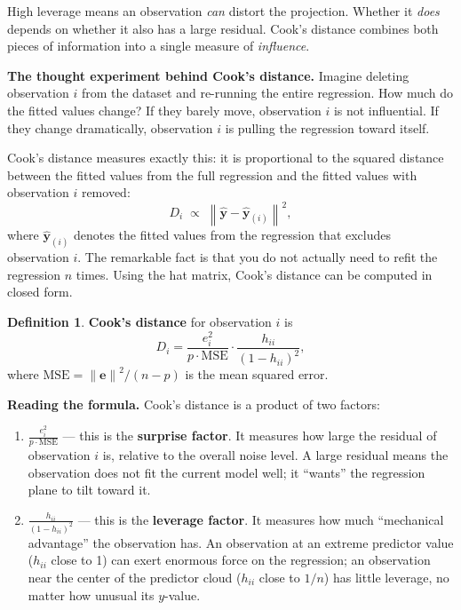 \documentclass[11pt,a4paper]{article}
\theoremstyle{plain}
\theoremstyle{definition}
\newtheorem{definition}[theorem]{Definition}
\newcommand{\yhat}{\hat{\bm{y}}}
\newcommand{\be}{\bm{e}}
\newcommand{\norm}[1]{\left\lVert #1 \right\rVert}
\begin{document}
High leverage means an observation \emph{can} distort the projection.
Whether it \emph{does} depends on whether it also has a large residual.
Cook's distance combines both pieces of information into a single measure of \emph{influence}.

\medskip
\noindent\textbf{The thought experiment behind Cook's distance.}
Imagine deleting observation $i$ from the dataset and re-running the entire regression.
How much do the fitted values change?
If they barely move, observation $i$ is not influential.
If they change dramatically, observation $i$ is pulling the regression toward itself.

Cook's distance measures exactly this: it is proportional to the squared distance between the fitted values from the full regression and the fitted values with observation $i$ removed:
\[
  D_i \;\propto\; \norm{\yhat - \yhat_{(i)}}^2,
\]
where $\yhat_{(i)}$ denotes the fitted values from the regression that excludes observation $i$.
The remarkable fact is that you do not actually need to refit the regression $n$ times.
Using the hat matrix, Cook's distance can be computed in closed form.

\begin{definition}
\textbf{Cook's distance} for observation $i$ is
\[
  D_i = \frac{e_i^2}{p\cdot\text{MSE}}
        \cdot \frac{h_{ii}}{(1 - h_{ii})^2},
\]
where $\text{MSE} = \norm{\be}^2/(n-p)$ is the mean squared error.
\end{definition}

\noindent\textbf{Reading the formula.}
Cook's distance is a product of two factors:
\begin{enumerate}[nosep]
  \item $\frac{e_i^2}{p\cdot\text{MSE}}$ --- this is the \textbf{surprise factor}.
    It measures how large the residual of observation $i$ is, relative to the overall noise level.
    A large residual means the observation does not fit the current model well; it ``wants'' the regression plane to tilt toward it.
  \item $\frac{h_{ii}}{(1 - h_{ii})^2}$ --- this is the \textbf{leverage factor}.
    It measures how much ``mechanical advantage'' the observation has.
    An observation at an extreme predictor value ($h_{ii}$ close to 1) can exert enormous force on the regression; an observation near the center of the predictor cloud ($h_{ii}$ close to $1/n$) has little leverage, no matter how unusual its $y$-value.
\end{enumerate}
\end{document}
